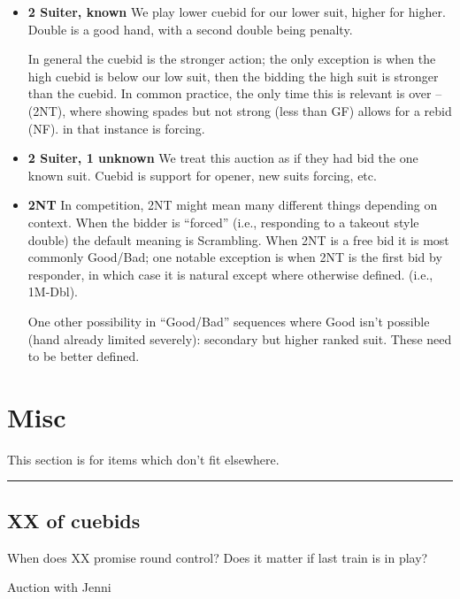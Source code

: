 \documentclass[main]{subfile}
\begin{document}
\begin{itemize}[]
\item \textbf{2 Suiter, known} We play lower cuebid for our lower suit, higher for higher. Double is a good hand, with a second double being penalty.

In general the cuebid is the stronger action; the only exception is when the high cuebid is below our low suit, then the bidding the high suit is stronger than the cuebid.  In common practice, the only time this is relevant is over --(2NT), where  showing spades but not strong (less than GF) allows for a  rebid (NF).  in that instance is forcing.	

\item \textbf{2 Suiter, 1 unknown} We treat this auction as if they had bid the one known suit. Cuebid is support for opener, new suits forcing, etc.

\item \textbf{2NT} In competition, 2NT might mean many different things depending on context. When the bidder is ``forced'' (i.e., responding to a takeout style double) the default meaning is Scrambling. When 2NT is a free bid it is most commonly Good/Bad; one notable exception is when 2NT is the first bid by responder, in which case it is natural except where otherwise defined. (i.e., 1M-Dbl).

One other possibility in ``Good/Bad'' sequences where Good isn't possible (hand already limited severely): secondary but higher ranked suit. These need to be better defined. 
\end{itemize}

\section{Misc}

This section is for items which don't fit elsewhere.

\vspace{1em}\hrule

\subsection{XX of cuebids}

When does XX promise \first round control? Does it matter if last train is in play?

Auction with Jenni

\end{document}
